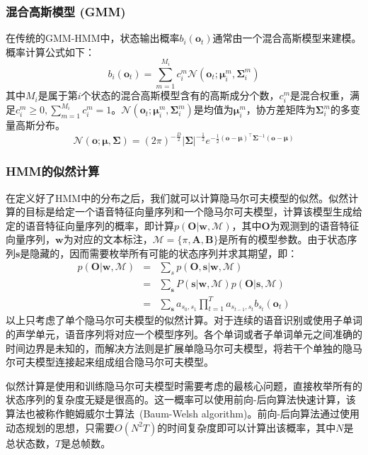 \subsubsection{混合高斯模型 (GMM)}
在传统的GMM-HMM中，状态输出概率$b_i(\mathbf{o}_t)$通常由一个混合高斯模型来建模。概率计算公式如下：
\begin{equation}
    b_i(\mathbf{o}_t)=\sum_{m=1}^{M_i}c^m_{i}\mathcal{N}(\mathbf{o}_t;\bm{\mu}^m_{i},\bm{\Sigma}^m_{i})
\end{equation}
其中$M_i$是属于第$i$个状态的混合高斯模型含有的高斯成分个数，$c^m_{i}$是混合权重，满足$c^m_{i} \ge 0, \sum_{m=1}^{M_i} c^m_{i}=1$。$\mathcal{N}(\mathbf{o}_t;\bm{\mu}^m_{i},\bm{\Sigma}^m_{i})$是均值为$\bm{\mu}^m_{i}$，协方差矩阵为$\bm{\Sigma}^m_{i}$的多变量高斯分布。
\begin{equation}
    \mathcal{N}(\mathbf{o};\bm{\mu},\bm{\Sigma})=(2\pi)^{-\frac{D}{2}}{|\bm{\Sigma}|}^{-\frac{1}{2}}e^{-\frac{1}{2}(\mathbf{o}-\bm{\mu})^{\top}\bm{\Sigma}^{-1}(\mathbf{o}-\bm{\mu})}
\end{equation}

\subsubsection{HMM的似然计算}
\label{sec:calc_like}
在定义好了HMM中的分布之后，我们就可以计算隐马尔可夫模型的似然。似然计算的目标是给定一个语音特征向量序列和一个隐马尔可夫模型，计算该模型生成给定的语音特征向量序列的概率，即计算$p(\mathbf{O}|\mathbf{w},\mathcal{M})$，其中$\mathbf{O}$为观测到的语音特征向量序列，$\mathbf{w}$为对应的文本标注，$\mathcal{M}=\{\pi, \mathbf{A}, \mathbf{B}\}$是所有的模型参数。由于状态序列$\mathbf{s}$是隐藏的，因而需要枚举所有可能的状态序列并求其期望，即：
\begin{eqnarray}
p(\mathbf{O}|\mathbf{w},\mathcal{M}) &=& \sum_{s}p(\mathbf{O},\mathbf{s}|\mathbf{w},\mathcal{M}) \\
&=& \sum_{\mathbf{s}} P(\mathbf{s}|\mathbf{w},\mathcal{M})p(\mathbf{O}|\mathbf{s},\mathcal{M}) \\
&=& \sum_{\mathbf{s}} a_{s_0, s_1}\prod_{t=1}^T a_{s_{t-1}, s_t}b_{s_t}(\mathbf{o}_t)
\end{eqnarray}
以上只考虑了单个隐马尔可夫模型的似然计算。对于连续的语音识别或使用子单词的声学单元，语音序列将对应一个模型序列。各个单词或者子单词单元之间准确的时间边界是未知的，而解决方法则是扩展单隐马尔可夫模型，将若干个单独的隐马尔可夫模型连接起来组成组合隐马尔可夫模型。

似然计算是使用和训练隐马尔可夫模型时需要考虑的最核心问题，直接枚举所有的状态序列的复杂度无疑是很高的。这一概率可以使用前向-后向算法快速计算，该算法也被称作鲍姆威尔士算法~\cite{baum1967inequality}(Baum-Welsh algorithm)。前向-后向算法通过使用动态规划的思想，只需要$O(N^2T)$的时间复杂度即可以计算出该概率，其中$N$是总状态数，$T$是总帧数。

